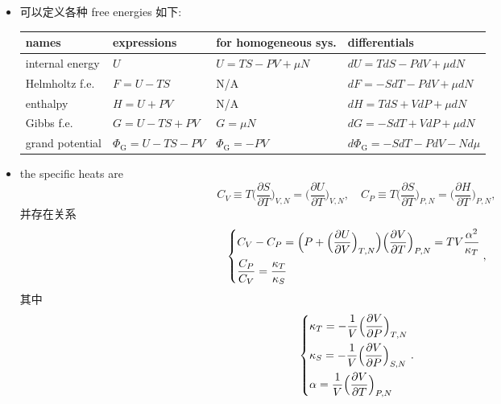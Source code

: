 \begin{itemize}
	\item 可以定义各种 free energies 如下:
	
	\begin{center}
		\begin{tabularx}{\linewidth}{XXXl}
			\toprule 
			names & expressions & for homogeneous sys. & differentials \\
			\midrule 
			internal energy & $U$ & $U = T S - P V + \mu N$ & $dU = T dS - P dV + \mu dN$ \\
			Helmholtz f.e. & $F = U - T S$ & N/A & $dF = - S dT - P dV + \mu dN$ \\
			enthalpy & $H = U + P V$ & N/A & $dH = T dS + V dP + \mu dN$ \\
			Gibbs f.e. & $G = U - T S + P V$ & $G = \mu N$ & $dG = - S dT + V dP + \mu dN$ \\
			grand potential & $\Phi_\text{G} = U - T S - P V$ & $\Phi_\text{G} = - P V$ & $d\Phi_\text{G} = - S dT - P dV - N d\mu$ \\
			\bottomrule
		\end{tabularx}
	\end{center}
	
	\item the specific heats are
	\begin{equation}
		C_V \equiv T \Big( \frac{\partial S}{\partial T} \Big)_{V, N} = \Big( \frac{\partial U}{\partial T} \Big)_{V, N}, \quad C_P \equiv T \Big( \frac{\partial S}{\partial T} \Big)_{P, N} = \Big( \frac{\partial H}{\partial T} \Big)_{P, N},
	\end{equation}
	并存在关系
	\begin{equation}
		\begin{dcases}
			C_V - C_P = \Big( P + \Big( \frac{\partial U}{\partial V} \Big)_{T, N} \Big) \Big( \frac{\partial V}{\partial T} \Big)_{P, N}  = T V \frac{\alpha^2}{\kappa_T} \\
			\frac{C_P}{C_V} = \frac{\kappa_T}{\kappa_S}
		\end{dcases},
	\end{equation}
	其中
	\begin{equation}
		\begin{dcases}
			\kappa_T = - \frac{1}{V} \Big( \frac{\partial V}{\partial P} \Big)_{T, N} \\
			\kappa_S = - \frac{1}{V} \Big( \frac{\partial V}{\partial P} \Big)_{S, N} \\
			\alpha = \frac{1}{V} \Big( \frac{\partial V}{\partial T} \Big)_{P, N}
		\end{dcases}.
	\end{equation}
\end{itemize}

